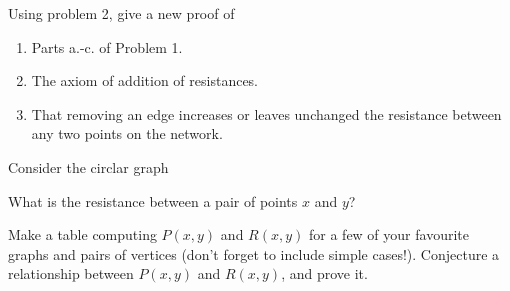 \documentclass[11pt,fleqn]{book} %
\begin{document}
\begin{problem}
  Using problem 2, give a new proof of 
  \begin{enumerate}[label =\alph*.]
   \item Parts a.-c. of Problem 1. 
   \item The axiom of addition of resistances.
   \item That removing an edge increases or leaves unchanged the resistance between any two points on the network.
  \end{enumerate}
\end{problem}


\begin{problem}
  Consider the circlar graph 
  \begin{center}
   \end{center} 
   What is the resistance between a pair of points $x$ and $y$?
\end{problem}

\begin{problem}
Make a table computing $P(x,y)$ and $R(x,y)$ for a few of your favourite graphs and pairs of vertices (don't forget to include simple cases!). Conjecture a relationship between $P(x,y)$ and $R(x,y)$, and prove it.
\end{problem}
\end{document}
